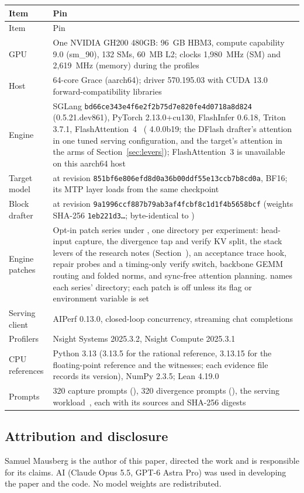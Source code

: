 {\small
\begin{longtable}{@{}P{3.4cm}P{13.1cm}@{}}
\toprule Item & Pin\\\midrule\endfirsthead
\toprule Item & Pin\\\midrule\endhead
\bottomrule\endlastfoot
GPU & One NVIDIA GH200 480GB: 96~GB HBM3, compute capability 9.0 (sm\_90), 132 SMs, 60~MB L2; clocks 1,980~MHz (SM) and 2,619~MHz (memory) during the profiles\\
Host & 64-core Grace (aarch64); driver 570.195.03 with CUDA 13.0 forward-compatibility libraries\\
Engine & SGLang \texttt{bd66ce343e4f6e2f2b75d7e820fe4d0718a8d824} (0.5.21.dev861), PyTorch 2.13.0+cu130, FlashInfer 0.6.18, Triton 3.7.1, FlashAttention~4~\cite{fa4} ( 4.0.0b19; the DFlash drafter's attention in one tuned serving configuration, and the target's attention in the arms of Section~\ref{sec:levers}); FlashAttention~3 is unavailable on this aarch64 host\\
Target model &  at revision \texttt{851bf6e806efd8d0a36b00ddf55e13ccb7b8cd0a}, BF16; its MTP layer loads from the same checkpoint\\
Block drafter &  at revision \texttt{9a1996ccf887b79ab3af4fcbf8c1d1f4b5658bcf} (weights SHA-256 \texttt{1eb221d3\ldots}; byte-identical to )\\
Engine patches & Opt-in patch series under , one directory per experiment: head-input capture, the divergence tap and verify KV split, the stack levers of the research notes (Section~), an acceptance trace hook, repair probes and a timing-only verify switch, backbone GEMM routing and folded norms, and sync-free attention planning.  names each series' directory; each patch is off unless its flag or environment variable is set\\
Serving client & AIPerf 0.13.0, closed-loop concurrency, streaming chat completions\\
Profilers & Nsight Systems 2025.3.2, Nsight Compute 2025.3.1\\
CPU references & Python 3.13 (3.13.5 for the rational reference, 3.13.15 for the floating-point reference and the witnesses; each evidence file records its version), NumPy 2.3.5; Lean 4.19.0\\
Prompts & 320 capture prompts (), 320 divergence prompts (), the serving workload~, each with its sources and SHA-256 digests\\
\end{longtable}}

\subsection{Attribution and disclosure}\label{app:attribution}
Samuel Mausberg is the author of this paper, directed the work and is responsible for its claims. AI (Claude Opus 5.5, GPT-6 Astra Pro) was used in developing the paper and the code. No model weights are redistributed.
